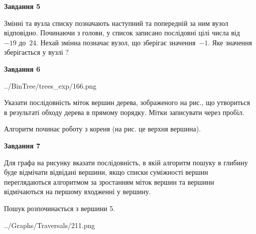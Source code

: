 \documentclass[12pt, ukrainian]{article}
\begin{document}
{\begin {large}
{\begin {center}\textbf{Завдання 5}\end {center}}\par
Змінні  та  вузла списку позначають наступний та попередній за ним вузол відповідно. Починаючи з голови, у список записано послідовні цілі числа від~$-19$ до~$24$. Нехай змінна  позначає вузол, що зберігає значення~$-1$.
Яке значення зберігається у вузлі  ?\par
\newpage

{\begin {center}\textbf{Завдання 6}\end {center}}\par

\begin{center}
	{../BinTree/trees_exp/166.png}
\end{center}
Указати послідовність міток вершин дерева, зображеного на рис., що утвориться в результаті обходу дерева в прямому порядку. Мітки записувати через пробіл.\par Алгоритм починає роботу з кореня (на рис. це верхня вершина).\par
\newpage

{\begin {center}\textbf{Завдання 7}\end {center}}\par
Для графа на рисунку вказати послідовність, в якій алгоритм пошуку в глибину буде відмічати відвідані вершини, якщо списки суміжності вершин переглядаються алгоритмом за зростанням міток вершин та вершини відмічаються на першому вход\-женні у вершину.\par
Пошук розпочинається з вершини 5.\par

\begin{center}
	{../Graphs/Traversals/211.png}
\end{center}\par
\newpage


\end{large}}
\end{document}
